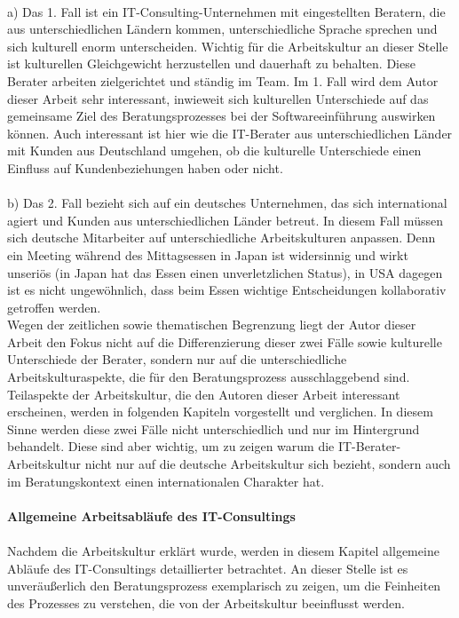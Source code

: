 	 \\
	 a) Das 1. Fall ist ein IT-Consulting-Unternehmen mit eingestellten Beratern, die aus unterschiedlichen Ländern kommen, unterschiedliche Sprache sprechen und sich kulturell enorm unterscheiden. Wichtig für die Arbeitskultur an dieser Stelle ist kulturellen Gleichgewicht herzustellen und dauerhaft zu behalten. Diese Berater arbeiten zielgerichtet und ständig im Team. Im 1. Fall wird dem Autor dieser Arbeit sehr interessant, inwieweit sich kulturellen Unterschiede auf das gemeinsame Ziel des Beratungsprozesses bei der Softwareeinführung auswirken können. Auch interessant ist hier wie die IT-Berater aus unterschiedlichen Länder mit Kunden aus Deutschland umgehen, ob die kulturelle Unterschiede einen Einfluss auf Kundenbeziehungen haben oder nicht. \\
	 \\
	 b) Das 2. Fall bezieht sich auf ein deutsches Unternehmen, das sich international agiert und Kunden aus unterschiedlichen Länder betreut. In diesem Fall müssen sich deutsche Mitarbeiter auf unterschiedliche Arbeitskulturen anpassen. Denn ein Meeting während des Mittagsessen in Japan ist widersinnig und wirkt unseriös (in Japan hat das Essen einen unverletzlichen Status), in USA dagegen ist es nicht ungewöhnlich, dass beim Essen wichtige Entscheidungen kollaborativ getroffen werden.\\
	Wegen der zeitlichen sowie thematischen Begrenzung liegt der Autor dieser Arbeit den Fokus nicht auf die Differenzierung dieser zwei Fälle sowie kulturelle Unterschiede der Berater, sondern nur auf die unterschiedliche Arbeitskulturaspekte, die für den Beratungsprozess ausschlaggebend sind. Teilaspekte der Arbeitskultur, die den Autoren dieser Arbeit interessant erscheinen, werden in folgenden Kapiteln vorgestellt und verglichen. In diesem Sinne werden diese zwei Fälle nicht unterschiedlich und nur im Hintergrund behandelt.
	Diese sind aber wichtig, um zu zeigen warum die IT-Berater-Arbeitskultur nicht nur auf die deutsche Arbeitskultur sich bezieht, sondern auch im Beratungskontext einen internationalen Charakter hat.\\
	\\
\textbf{Allgemeine Arbeitsabläufe des IT-Consultings}\\ \\
	Nachdem die Arbeitskultur erklärt wurde, werden in diesem Kapitel allgemeine Abläufe des IT-Consultings detaillierter betrachtet. An dieser Stelle ist es unveräußerlich den Beratungsprozess exemplarisch zu zeigen, um die Feinheiten des Prozesses zu verstehen, die von der Arbeitskultur beeinflusst werden. 
